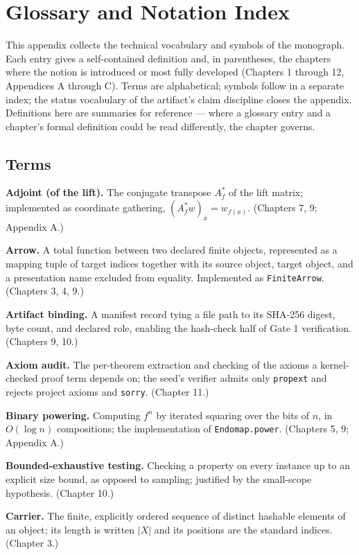 \chapter{Glossary and Notation Index}\label{appC:glossary}

This appendix collects the technical vocabulary and symbols of the
monograph. Each entry gives a self-contained definition and, in
parentheses, the chapters where the notion is introduced or most fully
developed (Chapters 1 through 12, Appendices A through C). Terms are
alphabetical; symbols follow in a separate index; the status vocabulary
of the artifact's claim discipline closes the appendix. Definitions
here are summaries for reference --- where a glossary entry and a
chapter's formal definition could be read differently, the chapter
governs.

\section{Terms}\label{appC:sec:terms}

\textbf{Adjoint (of the lift).} The conjugate transpose $A_f^{*}$ of
the lift matrix; implemented as coordinate gathering,
$(A_f^{*} w)_x = w_{f(x)}$. (Chapters 7, 9; Appendix A.)

\textbf{Arrow.} A total function between two declared finite objects,
represented as a mapping tuple of target indices together with its
source object, target object, and a presentation name excluded from
equality. Implemented as \texttt{FiniteArrow}. (Chapters 3, 4, 9.)

\textbf{Artifact binding.} A manifest record tying a file path to its
SHA-256 digest, byte count, and declared role, enabling the hash-check
half of Gate 1 verification. (Chapters 9, 10.)

\textbf{Axiom audit.} The per-theorem extraction and checking of the
axioms a kernel-checked proof term depends on; the seed's verifier
admits only \texttt{propext} and rejects project axioms and
\texttt{sorry}. (Chapter 11.)

\textbf{Binary powering.} Computing $f^{n}$ by iterated squaring over
the bits of $n$, in $O(\log n)$ compositions; the implementation of
\texttt{Endomap.power}. (Chapters 5, 9; Appendix A.)

\textbf{Bounded-exhaustive testing.} Checking a property on every
instance up to an explicit size bound, as opposed to sampling;
justified by the small-scope hypothesis. (Chapter 10.)

\textbf{Carrier.} The finite, explicitly ordered sequence of distinct
hashable elements of an object; its length is written $|X|$ and its
positions are the standard indices. (Chapter 3.)

